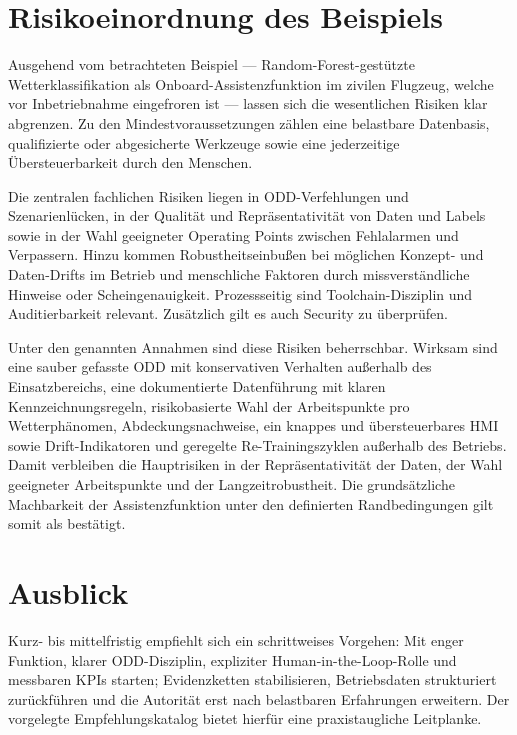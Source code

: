 \section{Risikoeinordnung des Beispiels}

Ausgehend vom betrachteten Beispiel — Random-Forest-gestützte Wetterklassifikation als 
Onboard-Assistenzfunktion im zivilen Flugzeug, welche vor Inbetriebnahme 
eingefroren ist — lassen sich die wesentlichen Risiken klar abgrenzen. 
Zu den Mindestvoraussetzungen zählen eine belastbare Datenbasis, qualifizierte oder abgesicherte 
Werkzeuge sowie eine jederzeitige Übersteuerbarkeit durch den Menschen.

Die zentralen fachlichen Risiken liegen in ODD-Verfehlungen und Szenarienlücken, in der 
Qualität und Repräsentativität von Daten und Labels sowie in der Wahl geeigneter Operating 
Points zwischen Fehlalarmen und Verpassern. Hinzu kommen Robustheitseinbußen bei möglichen 
Konzept- und Daten-Drifts im Betrieb und menschliche Faktoren durch 
missverständliche Hinweise oder Scheingenauigkeit. Prozessseitig sind Toolchain-Disziplin 
und Auditierbarkeit relevant. Zusätzlich gilt es auch Security zu überprüfen.

Unter den genannten Annahmen sind diese Risiken beherrschbar. Wirksam sind eine sauber 
gefasste ODD mit konservativen Verhalten außerhalb des Einsatzbereichs, eine dokumentierte 
Datenführung mit klaren Kennzeichnungsregeln, risikobasierte Wahl der Arbeitspunkte pro 
Wetterphänomen, Abdeckungsnachweise, ein knappes und übersteuerbares HMI sowie 
Drift-Indikatoren und geregelte Re-Trainingszyklen außerhalb des Betriebs. 
Damit verbleiben die Hauptrisiken in der Repräsentativität der Daten, der Wahl geeigneter 
Arbeitspunkte und der Langzeitrobustheit. Die grundsätzliche Machbarkeit der Assistenzfunktion 
unter den definierten Randbedingungen gilt somit als bestätigt.



\section{Ausblick}
Kurz- bis mittelfristig empfiehlt sich ein schrittweises Vorgehen: Mit enger Funktion, klarer ODD-Disziplin, 
expliziter Human-in-the-Loop-Rolle und messbaren KPIs starten; Evidenzketten stabilisieren, Betriebsdaten strukturiert zurückführen 
und die Autorität erst nach belastbaren Erfahrungen erweitern. Der vorgelegte Empfehlungskatalog bietet 
hierfür eine praxistaugliche Leitplanke.
\medskip

